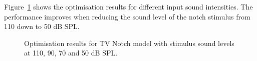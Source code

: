 

Figure~\ref{fig:TV_result_spl} shows the optimisation results for different
input sound intensities.  The performance improves when reducing the sound level
of the notch stimulus from 110 down to 50 dB SPL.
\begin{figure}[!ht]
  \centering
  \caption{Optimisation results for TV Notch model with stimulus sound levels at
    110, 90, 70 and 50 dB SPL.}
  \label{fig:TV_result_spl}
\end{figure}


